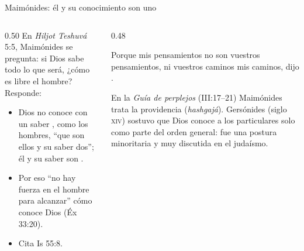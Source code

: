 \begin{frame}{Maimónides: él y su conocimiento son uno}
\begin{columns}[t,onlytextwidth]
\begin{column}{0.50\textwidth}\small
En \emph{Hiljot Teshuvá} 5:5, Maimónides se pregunta: si Dios sabe todo lo que será, ¿cómo es libre el hombre? Responde:
\begin{itemize}
\item Dios no conoce con un saber , como los hombres, ``que son ellos y su saber dos''; él y su saber son .
\item Por eso ``no hay fuerza en el hombre para alcanzar'' cómo conoce Dios (Éx 33:20).
\item Cita Is 55:8.
\end{itemize}
\begin{center}\end{center}
\end{column}
\begin{column}{0.48\textwidth}
\begin{cita}Porque mis pensamientos no son vuestros pensamientos, ni vuestros caminos mis caminos, dijo \SENOR{}.\end{cita}
\scriptsize En la \emph{Guía de perplejos} (III:17--21) Maimónides trata la providencia (\emph{hashgajá}). Gersónides (siglo \textsc{xiv}) sostuvo que Dios conoce a los particulares solo como parte del orden general: fue una postura minoritaria y muy discutida en el judaísmo.\par\smallskip
{}
\end{column}
\end{columns}
\end{frame}

